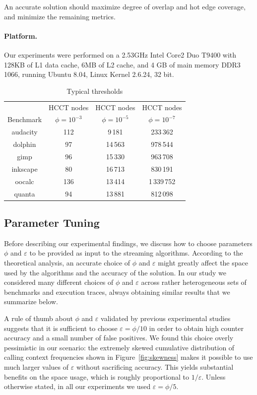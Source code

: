 \documentclass{sigplanconf}
\begin{document}
\noindent An accurate solution should maximize degree of overlap and hot edge coverage, and minimize the remaining metrics.

\paragraph{Platform.}  Our experiments were performed on a 2.53GHz Intel Core2 Duo T9400 with 128KB of L1 data cache, 6MB of L2 cache, and 4 GB of main memory DDR3 1066, running Ubuntu 8.04, Linux Kernel 2.6.24, 32 bit.

\begin{table}[t]
\caption{Typical thresholds}
\centering
\begin{small}
\begin{tabular}{c c c c}
\hline\hline
  & HCCT nodes  & HCCT nodes & HCCT nodes \\ 
Benchmark & $\phi=10^{-3}$  & $\phi=10^{-5}$ & $\phi=10^{-7}$ \\ 
\hline
audacity & 112 & 9\,181 & 233\,362 \\
dolphin & 97 & 14\,563 & 978\,544 \\
gimp & 96 & 15\,330 & 963\,708 \\
inkscape & 80 & 16\,713 & 830\,191 \\
oocalc & 136 & 13\,414 & 1\,339\,752 \\
quanta & 94 & 13\,881 & 812\,098 \\
\hline
\end{tabular}
\end{small}
\label{tab:phi}
\end{table}


\subsection{Parameter Tuning}
\label{ss:tuning}

Before describing our experimental findings, we discuss how to choose parameters $\phi$ and $\varepsilon$ to be provided as input to the streaming algorithms. According to the theoretical analysis, an accurate choice of $\phi$ and $\varepsilon$  might greatly affect the space used by the algorithms and the accuracy of the solution. In our study we considered many different choices of $\phi$ and $\varepsilon$ across rather heterogeneous sets of benchmarks and execution traces, always obtaining similar results that we summarize below. 

A rule of thumb about $\phi$ and $\varepsilon$ validated by previous experimental studies~\cite{CH08} suggests that it is sufficient to choose $\varepsilon=\phi/10$ in order to obtain high counter accuracy and a small number of false positives. We found this choice overly pessimistic in our scenario: the extremely skewed cumulative distribution of calling context frequencies shown in Figure~\ref{fig:skewness} makes it possible to use much larger values of $\varepsilon$ without sacrificing accuracy. This yields substantial benefits on the space usage, which is roughly proportional to $1/\varepsilon$. Unless otherwise stated, in all our experiments we used $\varepsilon=\phi/5$.
\end{document}
